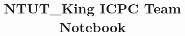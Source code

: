 \documentclass[10pt]{article}
\title{\vspace{-4ex}\Large{NTUT\_King ICPC Team Notebook}}
\author{}
\date{}
\begin{document}
\begin{landscape}
\begin{multicols}{2}
\begin{CJK*}{UTF8}{bsmi}
\maketitle
\vspace{-13ex}
\tableofcontents
\pagestyle{fancy}



\end{CJK*}
\end{multicols}
\end{landscape}
\end{document}
